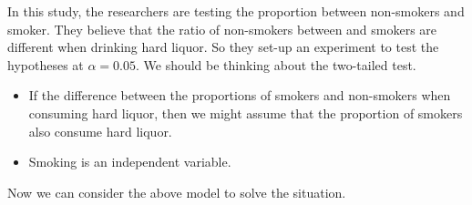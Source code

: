 \documentclass[11pt, chapterprefix=true]{scrbook}\usepackage[]{graphicx}\usepackage[]{color}
\begin{document}
In this study, the researchers are testing the proportion between non-smokers and smoker.  They believe that the ratio of non-smokers between and smokers are different when drinking hard liquor.  So they set-up an experiment to test the hypotheses at $\alpha = 0.05$.  We should be thinking about the two-tailed test.

\begin{itemize}
\item If the difference between the proportions of smokers and non-smokers when consuming hard liquor, then we might assume that the proportion of smokers also consume hard liquor.    
\item Smoking is an independent variable.
\end{itemize}

Now we can consider the above model to solve the situation.
\end{document}
